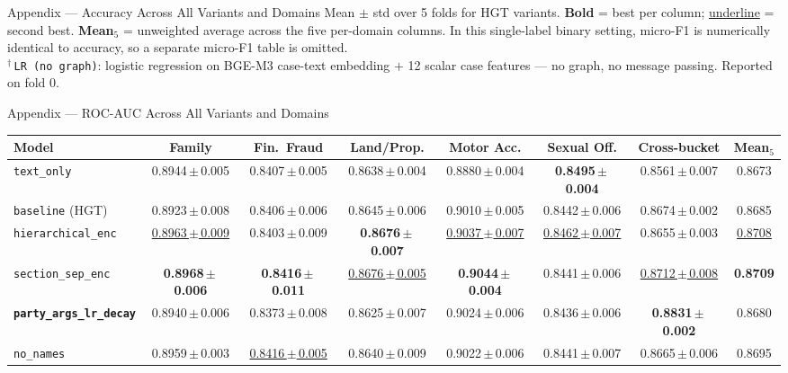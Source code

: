 \documentclass[aspectratio=169,11pt]{beamer}
\begin{document}
\begin{frame}{Appendix --- Accuracy Across All Variants and Domains}
  \vspace{0.5em}
  \scriptsize Mean $\pm$ std over 5 folds for HGT variants. \textbf{Bold} = best per column; \underline{underline} = second best. \textbf{Mean$_5$} = unweighted average across the five per-domain columns. In this single-label binary setting, micro-F1 is numerically identical to accuracy, so a separate micro-F1 table is omitted.\\
  $^\dagger$\,\texttt{LR (no graph)}: logistic regression on BGE-M3 case-text embedding $+$ 12 scalar case features --- no graph, no message passing. Reported on fold 0.
\end{frame}

\begin{frame}{Appendix --- ROC-AUC Across All Variants and Domains}
  \tiny
  \centering
  \setlength{\tabcolsep}{3pt}
  \begin{adjustbox}{max width=\textwidth}
    \begin{tabular}{lccccccc}
      \toprule
      \textbf{Model} & \textbf{Family} & \textbf{Fin.\ Fraud} & \textbf{Land/Prop.} & \textbf{Motor Acc.} & \textbf{Sexual Off.} & \textbf{Cross-bucket} & \textbf{Mean$_5$} \\
      \midrule
      \texttt{text\_only}                       & 0.8944\,$\pm$\,0.005 & 0.8407\,$\pm$\,0.005 & 0.8638\,$\pm$\,0.004 & 0.8880\,$\pm$\,0.004 & \textbf{0.8495\,$\pm$\,0.004} & 0.8561\,$\pm$\,0.007 & 0.8673 \\
      \texttt{baseline} (HGT)                   & 0.8923\,$\pm$\,0.008 & 0.8406\,$\pm$\,0.006 & 0.8645\,$\pm$\,0.006 & 0.9010\,$\pm$\,0.005 & 0.8442\,$\pm$\,0.006 & 0.8674\,$\pm$\,0.002 & 0.8685 \\
      \texttt{hierarchical\_enc}                & \underline{0.8963\,$\pm$\,0.009} & 0.8403\,$\pm$\,0.009 & \textbf{0.8676\,$\pm$\,0.007} & \underline{0.9037\,$\pm$\,0.007} & \underline{0.8462\,$\pm$\,0.007} & 0.8655\,$\pm$\,0.003 & \underline{0.8708} \\
      \texttt{section\_sep\_enc}                & \textbf{0.8968\,$\pm$\,0.006} & \textbf{0.8416\,$\pm$\,0.011} & \underline{0.8676\,$\pm$\,0.005} & \textbf{0.9044\,$\pm$\,0.004} & 0.8441\,$\pm$\,0.006 & \underline{0.8712\,$\pm$\,0.008} & \textbf{0.8709} \\
      \textbf{\texttt{party\_args\_lr\_decay}}  & 0.8940\,$\pm$\,0.006 & 0.8373\,$\pm$\,0.008 & 0.8625\,$\pm$\,0.007 & 0.9024\,$\pm$\,0.006 & 0.8436\,$\pm$\,0.006 & \textbf{0.8831\,$\pm$\,0.002} & 0.8680 \\
      \texttt{no\_names}                        & 0.8959\,$\pm$\,0.003 & \underline{0.8416\,$\pm$\,0.005} & 0.8640\,$\pm$\,0.009 & 0.9022\,$\pm$\,0.006 & 0.8441\,$\pm$\,0.007 & 0.8665\,$\pm$\,0.006 & 0.8695 \\

\end{tabular}
\end{adjustbox}
\end{frame}
\end{document}
